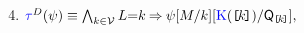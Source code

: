 \begin{minipage}[t]{.55\textwidth}
  \begin{enumerate}[topsep=0pt,label=(\textsc{w}\arabic*),ref=\textsc{w}\arabic*]
    \setcounter{enumi}{3}
  \item
    \begin{math}
      \aTr{\bEvs}{\bForm} \riff
      \textstyle\bigwedge_{\dVal\in\Val}
      \cExp{=}\dVal
      \limplies
        \bForm
        [\aExp/{\dVal}]
        [\kappaE{\REF{\dVal}}/\Q{\REF{\dVal}}],
      \end{math}

\end{enumerate}
\end{minipage}
